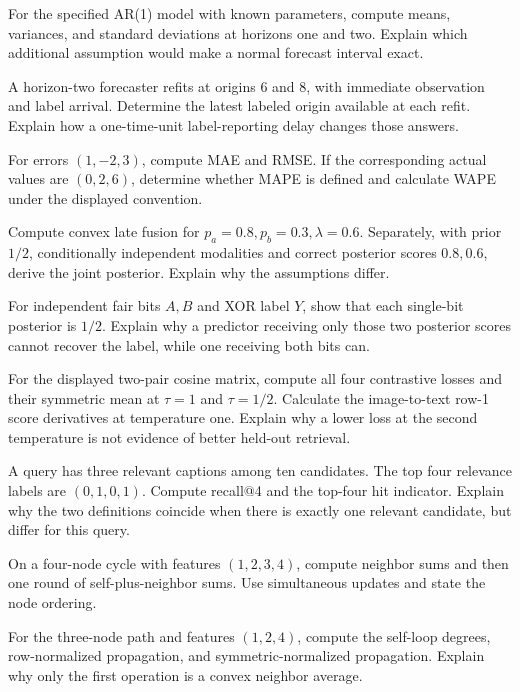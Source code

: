 \begin{exercises}
\item {}For the specified AR(1) model with known parameters, compute means, variances, and standard deviations at horizons one and two. Explain which additional assumption would make a normal forecast interval exact.
\item {}A horizon-two forecaster refits at origins 6 and 8, with immediate observation and label arrival. Determine the latest labeled origin available at each refit. Explain how a one-time-unit label-reporting delay changes those answers.
\item {}For errors $(1,-2,3)$, compute MAE and RMSE. If the corresponding actual values are $(0,2,6)$, determine whether MAPE is defined and calculate WAPE under the displayed convention.
\item {}Compute convex late fusion for $p_a=0.8,p_b=0.3,\lambda=0.6$. Separately, with prior $1/2$, conditionally independent modalities and correct posterior scores $0.8,0.6$, derive the joint posterior. Explain why the assumptions differ.
\item {}For independent fair bits $A,B$ and XOR label $Y$, show that each single-bit posterior is $1/2$. Explain why a predictor receiving only those two posterior scores cannot recover the label, while one receiving both bits can.
\item {}For the displayed two-pair cosine matrix, compute all four contrastive losses and their symmetric mean at $\tau=1$ and $\tau=1/2$. Calculate the image-to-text row-1 score derivatives at temperature one. Explain why a lower loss at the second temperature is not evidence of better held-out retrieval.
\item {}A query has three relevant captions among ten candidates. The top four relevance labels are $(0,1,0,1)$. Compute recall@4 and the top-four hit indicator. Explain why the two definitions coincide when there is exactly one relevant candidate, but differ for this query.
\item {}On a four-node cycle with features $(1,2,3,4)$, compute neighbor sums and then one round of self-plus-neighbor sums. Use simultaneous updates and state the node ordering.
\item {}For the three-node path and features $(1,2,4)$, compute the self-loop degrees, row-normalized propagation, and symmetric-normalized propagation. Explain why only the first operation is a convex neighbor average.

\end{exercises}
